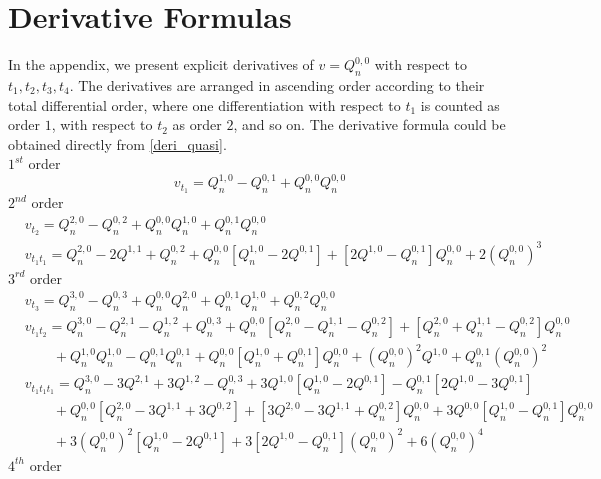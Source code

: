 \documentclass[11p,reqno]{amsart}
\numberwithin{equation}{section}
\numberwithin{equation}{section}
\begin{document}
\section{Derivative Formulas}
\noindent In the appendix, we present explicit derivatives of $v = Q_n^{0, 0}$ with respect to $t_1, t_2, t_3, t_4$. The derivatives are arranged in ascending order according to their total differential order, where one differentiation with respect to 
$t_1$ is counted as order $1$, with respect to $t_2$ as order $2$, and so on.  The derivative formula could be obtained directly from \eqref{deri_quasi}.\\
$1^{st}$ order
\[
    v_{t_1} = Q_n^{1, 0} - Q_n^{0, 1} + Q_n^{0, 0}Q_n^{0, 0}
\] 
$2^{nd}$ order
\begin{align*}
   & v_{t_2} = Q_n^{2, 0} - Q_n^{0, 2} + Q_n^{0, 0}Q_n^{1, 0} + Q_n^{0, 1}Q_n^{0, 0}\\
    & v_{t_1t_1} = Q_n^{2, 0} - 2Q^{1, 1} + Q_n^{0, 2} + Q_n^{0, 0}[Q_n^{1, 0} - 2Q^{0, 1}] + [2Q^{1, 0} - Q_n^{0, 1}]Q_n^{0, 0} + 2(Q_n^{0, 0})^3
\end{align*}
$3^{rd}$ order
\begin{align*}
   & v_{t_3} = Q_n^{3, 0} - Q_n^{0, 3} + Q_n^{0, 0}Q_n^{2, 0} + Q_n^{0, 1}Q_n^{1, 0} + Q_n^{0, 2}Q_n^{0, 0}\\
    &v_{t_1t_2} = Q_n^{3, 0} - Q_n^{2, 1} - Q_n^{1, 2} + Q_n^{0, 3} + Q_n^{0, 0}[Q_n^{2, 0} - Q_n^{1, 1} - Q_n^{0, 2}] + [Q_n^{2, 0} + Q_n^{1, 1} - Q_n^{0, 2}]Q_n^{0, 0} \\ 
    & \qquad + Q_n^{1, 0}Q_n^{1, 0} - Q_n^{0, 1}Q_n^{0, 1} + Q_n^{0, 0}[Q_n^{1, 0} + Q_n^{0, 1}]Q_n^{0, 0} + (Q_n^{0, 0})^2Q^{1, 0} + Q_n^{0, 1}(Q_n^{0, 0})^2\\
    &v_{t_1t_1t_1} = Q_n^{3, 0} - 3Q^{2, 1} + 3Q^{1, 2} - Q_n^{0, 3} + 3Q^{1, 0}[Q_n^{1, 0} - 2Q^{0, 1}] - Q_n^{0, 1}[2Q^{1, 0} - 3Q^{0, 1}] \\ \nonumber
    & \qquad + Q_n^{0, 0}[Q_n^{2, 0} - 3Q^{1, 1} + 3Q^{0, 2}] + [3Q^{2, 0} - 3Q^{1, 1} + Q_n^{0, 2}]Q_n^{0, 0} + 3Q^{0, 0}[Q_n^{1, 0} - Q_n^{0, 1}]Q_n^{0, 0} \\ \nonumber
    & \qquad + 3(Q_n^{0, 0})^2[Q_n^{1, 0} - 2Q^{0, 1}] + 3[2Q^{1, 0} - Q_n^{0, 1}](Q_n^{0, 0})^2 + 6(Q_n^{0, 0})^4
\end{align*}
$4^{th}$ order
\end{document}
